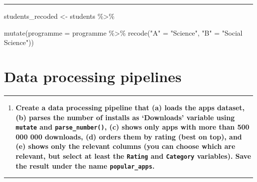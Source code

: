 \documentclass[
]{article}
\newenvironment{Shaded}{\begin{snugshade}}{\end{snugshade}}
\newcommand{\AttributeTok}[1]{\textcolor[rgb]{0.77,0.63,0.00}{#1}}
\newcommand{\FunctionTok}[1]{\textcolor[rgb]{0.00,0.00,0.00}{#1}}
\newcommand{\NormalTok}[1]{#1}
\newcommand{\OtherTok}[1]{\textcolor[rgb]{0.56,0.35,0.01}{#1}}
\newcommand{\SpecialCharTok}[1]{\textcolor[rgb]{0.00,0.00,0.00}{#1}}
\newcommand{\StringTok}[1]{\textcolor[rgb]{0.31,0.60,0.02}{#1}}
\providecommand{\tightlist}{%
  \setlength{\itemsep}{0pt}\setlength{\parskip}{0pt}}
\begin{document}
\begin{center}\rule{0.5\linewidth}{0.5pt}\end{center}

\begin{Shaded}
\begin{Highlighting}[]
\NormalTok{students\_recoded }\OtherTok{\textless{}{-}}\NormalTok{ students }\SpecialCharTok{\%\textgreater{}\%}

\FunctionTok{mutate}\NormalTok{(}\AttributeTok{programme =}\NormalTok{ programme }\SpecialCharTok{\%\textgreater{}\%} \FunctionTok{recode}\NormalTok{(}\StringTok{"A"} \OtherTok{=} \StringTok{"Science"}\NormalTok{, }\StringTok{"B"} \OtherTok{=} \StringTok{"Social Science"}\NormalTok{))}
\end{Highlighting}
\end{Shaded}

\hypertarget{data-processing-pipelines}{%
\section{Data processing pipelines}\label{data-processing-pipelines}}

\begin{center}\rule{0.5\linewidth}{0.5pt}\end{center}

\begin{enumerate}
\def\labelenumi{\arabic{enumi}.}
\setcounter{enumi}{15}
\tightlist
\item
  \textbf{Create a data processing pipeline that (a) loads the apps
  dataset, (b) parses the number of installs as `Downloads' variable
  using \texttt{mutate} and \texttt{parse\_number()}, (c) shows only
  apps with more than 500 000 000 downloads, (d) orders them by rating
  (best on top), and (e) shows only the relevant columns (you can choose
  which are relevant, but select at least the \texttt{Rating} and
  \texttt{Category} variables). Save the result under the name
  \texttt{popular\_apps}.}
\end{enumerate}

\begin{center}\rule{0.5\linewidth}{0.5pt}\end{center}
\end{document}
